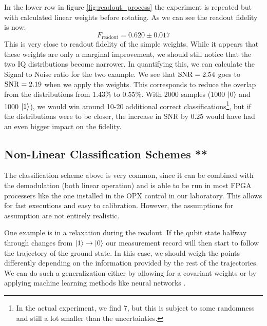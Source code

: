 In the lower row in figure \ref{fig:readout_process} the experiment is repeated but with calculated linear weights before rotating. As we can see the readout fidelity is now:
\begin{equation}
    F_{\text{readout}} = 0.620 \pm 0.017
\end{equation}
This is very close to readout fidelity of the simple weights. While it appears that these weights are only a marginal improvement, we should still notice that the two IQ distributions become narrower. In quantifying this, we can calculate the Signal to Noise ratio for the two example. We see that $\operatorname{SNR} = 2.54$ goes to $\operatorname{SNR} = 2.19$ when we apply the weights. This corresponds to reduce the overlap from the distributions from $1.43\%$ to $0.55\%$. With 2000 samples (1000 $\ket{0}$ and 1000 $\ket{1}$), we would win around 10-20 additional correct classifications\footnote{In the actual experiment, we find 7, but this is subject to some randomness and still a lot smaller than the uncertainties.}, but if the distributions were to be closer, the increase in SNR by $0.25$ would have had an even bigger impact on the fidelity.


\subsection{Non-Linear Classification Schemes ** }
The classification scheme above is very common, since it can be combined with the demodulation (both linear operation) and is able to be run in most FPGA processers like the one installed in the OPX control in our laboratory. This allows for fast executions and easy to calibration. However, the assumptions for assumption are not entirely realistic. 

One example is in a relaxation during the readout. If the qubit state halfway through changes from $\ket{1}\to \ket{0}$ our measurement record will then start to follow the trajectory of the ground state. In this case, we should weigh the points differently depending on the information provided by the rest of the trajectories. We can do such a generalization either by allowing for a covariant weights\cite{gambetta_protocols_2007} or by applying machine learning methods like neural networks \cite{lienhard_deep-neural-network_2022}.




